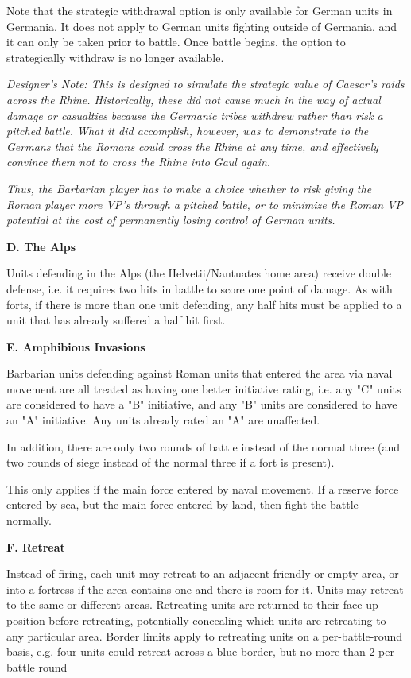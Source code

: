 Note that the strategic withdrawal option is only available for German units in Germania. It does not apply to German units fighting outside of Germania, and it can only be taken prior to battle. Once battle begins, the option to strategically withdraw is no longer available.

\textit{Designer's Note: This is designed to simulate the strategic value of Caesar's raids across the Rhine. Historically, these did not cause much in the way of actual damage or casualties because the Germanic tribes withdrew rather than risk a pitched battle. What it did accomplish, however, was to demonstrate to the Germans that the Romans could cross the Rhine at any time, and effectively convince them not to cross the Rhine into Gaul again.}
\par
\textit{Thus, the Barbarian player has to make a choice whether to risk giving the Roman player more VP's through a pitched battle, or to minimize the Roman VP potential at the cost of permanently losing control of German units.}

\textbf{D. The Alps}
\par
Units defending in the Alps (the Helvetii/Nantuates home area) receive double defense, i.e. it requires two hits in battle to score one point of damage. As with forts, if there is more than one unit defending, any half hits must be applied to a unit that has already suffered a half hit first.

\textbf{E. Amphibious Invasions}
\par
Barbarian units defending against Roman units that entered the area via naval movement are all treated as having one better initiative rating, i.e. any "C" units are considered to have a "B" initiative, and any "B" units are considered to have an "A" initiative. Any units already rated an "A" are unaffected.

In addition, there are only two rounds of battle instead of the normal three (and two rounds of siege instead of the normal three if a fort is present). 

This only applies if the main force entered by naval movement. If a reserve force entered by sea, but the main force entered by land, then fight the battle normally. 

\textbf{F. Retreat}
\par
Instead of firing, each unit may retreat to an adjacent friendly or empty area, or into a fortress if the area contains one and there is room for it. Units may retreat to the same or different areas. Retreating units are returned to their face up position before retreating, potentially concealing which units are retreating to any particular area. Border limits apply to retreating units on a per-battle-round basis, e.g. four units could retreat across a blue border, but no more than 2 per battle round

